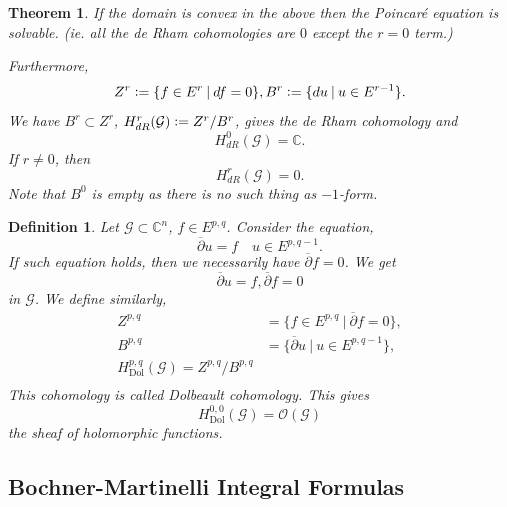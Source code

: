 \documentclass{article}
\newtheorem{theorem}{Theorem} [section]
\newtheorem{definition}{Definition}[section]
\DeclareMathOperator{\Dol}{Dol}
\newcommand{\defeq}{\vcentcolon=}
\newcommand{\C}[0]{\mathbb{C}}
\newcommand{\sep}[0]{\:|\:}
\begin{document}
\begin{theorem}
  If the domain is convex in the above then the Poincaré equation is solvable. (ie. all the de Rham cohomologies are $0$ except the $r=0$ term.)
  \par Furthermore,
  \begin{equation*}
    Z^r \defeq \{f\in E^r\sep df = 0\}, B^r \defeq \{du\sep u\in E^{r-1}\}.
  \end{equation*}
  We have $B^r\subset Z^r$, $H_{dR}^r(\mathcal{G}) \defeq Z^r/B^r$, gives the de Rham cohomology and 
  \begin{equation*}
    H_{dR}^0(\mathcal{G}) = \C.
  \end{equation*}
  If $r\not=0$, then 
  \begin{equation*}
    H_{dR}^r(\mathcal{G}) = 0.
  \end{equation*}
  Note that $B^0$ is empty as there is no such thing as $-1$-form.
\end{theorem}

\begin{definition}
  Let $\mathcal{G}\subset\C^n$, $f\in E^{p,q}$. Consider the equation,
  \begin{equation*}
    \overline{\partial}u = f \quad u\in E^{p,q-1}.
  \end{equation*}
  If such equation holds, then we necessarily have $\overline{\partial}f = 0$. We get 
  \begin{equation*}
    \overline{\partial}u = f, \overline{\partial}f = 0
  \end{equation*}
  in $\mathcal{G}$. We define similarly,
  \begin{align*}
    Z^{p,q} &= \{f\in E^{p,q}\sep \overline{\partial}f = 0\},\\
    B^{p,q} & = \{\overline{\partial}u \sep u\in E^{p,q-1}\},\\
    H^{p,q}_{\Dol}(\mathcal{G})=Z^{p,q}/B^{p,q}\\
  \end{align*}
  This cohomology is called Dolbeault cohomology. This gives 
  \begin{equation*}
    H^{0,0}_{\Dol}(\mathcal{G}) = \mathcal{O}(\mathcal{G})
  \end{equation*}
  the sheaf of holomorphic functions.
\end{definition}

\subsection{Bochner-Martinelli Integral Formulas}
\end{document}
